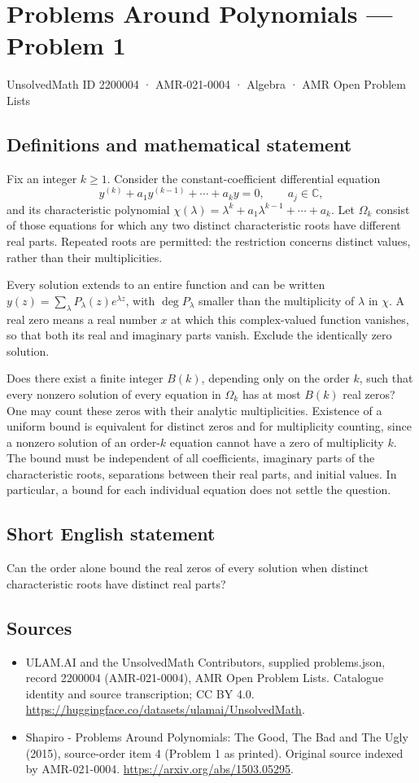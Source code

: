 \documentclass[11pt,a4paper]{article}
\begin{document}
\section*{Problems Around Polynomials — Problem 1}\label{2200004}
{\small UnsolvedMath ID 2200004 · AMR-021-0004 · Algebra · AMR Open Problem Lists}
\subsection{Definitions and mathematical statement}
Fix an integer $k\geq1$. Consider the constant-coefficient differential equation
\[
 y^{(k)}+a_1y^{(k-1)}+\cdots+a_ky=0,\qquad a_j\in\mathbb C,
\]
and its characteristic polynomial
$\chi(\lambda)=\lambda^k+a_1\lambda^{k-1}+\cdots+a_k$.
Let $\Omega_k$ consist of those equations for which any two distinct
characteristic roots have different real parts. Repeated roots are permitted:
the restriction concerns distinct values, rather than their multiplicities.

Every solution extends to an entire function and can be written
$y(z)=\sum_{\lambda}P_\lambda(z)e^{\lambda z}$, with
$\deg P_\lambda$ smaller than the multiplicity of $\lambda$ in $\chi$.
A real zero means a real number $x$ at which this complex-valued function
vanishes, so that both its real and imaginary parts vanish. Exclude the
identically zero solution.

Does there exist a finite integer $B(k)$, depending only on the order $k$,
such that every nonzero solution of every equation in $\Omega_k$ has at
most $B(k)$ real zeros? One may count these zeros with their analytic
multiplicities. Existence of a uniform bound is equivalent for distinct
zeros and for multiplicity counting, since a nonzero solution of an
order-$k$ equation cannot have a zero of multiplicity $k$.
The bound must be independent of all coefficients, imaginary parts of
the characteristic roots, separations between their real parts, and
initial values. In particular, a bound for each individual equation
does not settle the question.
\subsection{Short English statement}
Can the order alone bound the real zeros of every solution when distinct characteristic roots have distinct real parts?
\subsection{Sources}
\begin{itemize}
\item[S1] ULAM.AI and the UnsolvedMath Contributors, supplied problems.json, record 2200004 (AMR-021-0004), AMR Open Problem Lists. Catalogue identity and source transcription; CC BY 4.0.
\url{https://huggingface.co/datasets/ulamai/UnsolvedMath}.
\item[S2] Shapiro - Problems Around Polynomials: The Good, The Bad and The Ugly (2015), source-order item 4 (Problem 1 as printed). Original source indexed by AMR-021-0004.
\url{https://arxiv.org/abs/1503.05295}.
\end{itemize}
\end{document}
